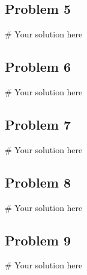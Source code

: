 \documentclass[
  letterpaper,
  DIV=11,
  numbers=noendperiod]{scrartcl}
\newenvironment{Shaded}{\begin{snugshade}}{\end{snugshade}}
\newcommand{\CommentTok}[1]{\textcolor[rgb]{0.37,0.37,0.37}{#1}}
\begin{document}
\subsection{Problem 5}\label{problem-5}

\begin{Shaded}
\begin{Highlighting}[]
\CommentTok{\# Your solution here}
\end{Highlighting}
\end{Shaded}

\subsection{Problem 6}\label{problem-6}

\begin{Shaded}
\begin{Highlighting}[]
\CommentTok{\# Your solution here}
\end{Highlighting}
\end{Shaded}

\subsection{Problem 7}\label{problem-7}

\begin{Shaded}
\begin{Highlighting}[]
\CommentTok{\# Your solution here}
\end{Highlighting}
\end{Shaded}

\subsection{Problem 8}\label{problem-8}

\begin{Shaded}
\begin{Highlighting}[]
\CommentTok{\# Your solution here}
\end{Highlighting}
\end{Shaded}

\subsection{Problem 9}\label{problem-9}

\begin{Shaded}
\begin{Highlighting}[]
\CommentTok{\# Your solution here}
\end{Highlighting}
\end{Shaded}
\end{document}
